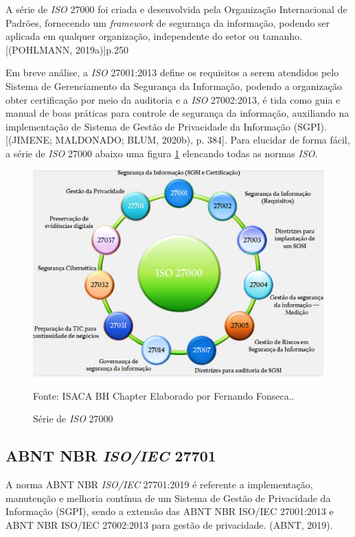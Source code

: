 \documentclass[
	12pt,				%
	openright,			%
	oneside,			%
	a4paper,			%
	english,			%
	french,				%
	spanish,			%
	brazil,				%
	]{abntex2}
\begin{document}
A série de \textit{ISO} 27000 foi criada e desenvolvida pela Organização Internacional de Padrões, fornecendo um \textit{framework} de segurança da informação, podendo ser aplicada em qualquer organização, independente do setor ou tamanho. [(POHLMANN, 2019a)]p.250

Em breve análise, a \textit{ISO} 27001:2013 define os requisitos a serem atendidos pelo Sistema de Gerenciamento da Segurança da Informação, podendo a organização obter certificação por meio da auditoria e a \textit{ISO} 27002:2013, é tida como guia e manual de boas práticas para controle de segurança da informação, auxiliando na implementação de Sistema de Gestão de Privacidade da Informação (SGPI). [(JIMENE; MALDONADO; BLUM, 2020b), p. 384]. Para elucidar de forma fácil, a série de \textit{ISO} 27000 abaixo uma figura \ref{fig: Iso } elencando todas as normas \textit{ISO}.

\begin{figure}[ht]
    \centering
    \caption{Série de \textit{ISO} 27000}
    \includegraphics[width=6.0in]{Images/03ISO.jpeg}
    
    \label{fig: Iso }
    \centering \small Fonte: ISACA BH Chapter Elaborado por Fernando Fonseca..
\end{figure}

\subsection{ABNT NBR \textit{ISO/IEC} 27701 }

A norma ABNT NBR \textit{ISO/IEC} 27701:2019 é referente a implementação, manutenção e melhoria contínua de um Sistema de Gestão de Privacidade da Informação (SGPI), sendo a extensão das ABNT NBR ISO/IEC 27001:2013 e ABNT NBR ISO/IEC 27002:2013 para gestão de privacidade. (ABNT, 2019).
\end{document}
